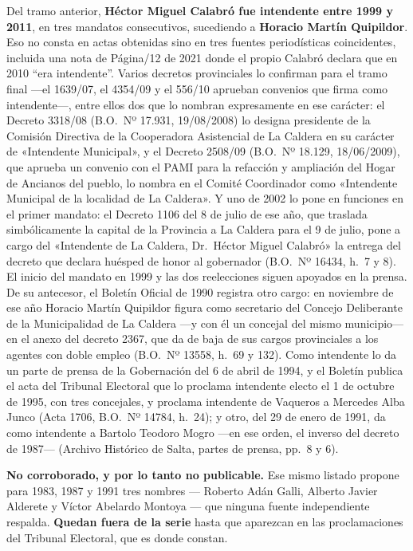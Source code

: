 \begin{cautela}
Del tramo anterior, \textbf{Héctor Miguel Calabró fue intendente entre 1999 y 2011}, en tres mandatos consecutivos, sucediendo a \textbf{Horacio Martín Quipildor}. Eso no consta en actas obtenidas sino en tres fuentes periodísticas coincidentes, incluida una nota de Página/12 de 2021 donde el propio Calabró declara que en 2010 ``era intendente''. Varios decretos provinciales lo confirman para el tramo final ---el 1639/07, el 4354/09 y el 556/10 aprueban convenios que firma como intendente---, entre ellos dos que lo nombran expresamente en ese carácter: el Decreto 3318/08 (B.O.\ Nº 17.931, 19/08/2008) lo designa presidente de la Comisión Directiva de la Cooperadora Asistencial de La Caldera en su carácter de «Intendente Municipal», y el Decreto 2508/09 (B.O.\ Nº 18.129, 18/06/2009), que aprueba un convenio con el PAMI para la refacción y ampliación del Hogar de Ancianos del pueblo, lo nombra en el Comité Coordinador como «Intendente Municipal de la localidad de La Caldera». Y uno de 2002 lo pone en funciones en el primer mandato: el Decreto 1106 del 8 de julio de ese año, que traslada simbólicamente la capital de la Provincia a La Caldera para el 9 de julio, pone a cargo del «Intendente de La Caldera, Dr.\ Héctor Miguel Calabró» la entrega del decreto que declara huésped de honor al gobernador (B.O.\ Nº 16434, h.\ 7 y 8). El inicio del mandato en 1999 y las dos reelecciones siguen apoyados en la prensa. De su antecesor, el Boletín Oficial de 1990 registra otro cargo: en noviembre de ese año Horacio Martín Quipildor figura como secretario del Concejo Deliberante de la Municipalidad de La Caldera ---y con él un concejal del mismo municipio--- en el anexo del decreto 2367, que da de baja de sus cargos provinciales a los agentes con doble empleo (B.O.\ Nº 13558, h.\ 69 y 132). Como intendente lo da un parte de prensa de la Gobernación del 6 de abril de 1994, y el Boletín publica el acta del Tribunal Electoral que lo proclama intendente electo el 1 de octubre de 1995, con tres concejales, y proclama intendente de Vaqueros a Mercedes Alba Junco (Acta 1706, B.O.\ Nº 14784, h.\ 24); y otro, del 29 de enero de 1991, da como intendente a Bartolo Teodoro Mogro ---en ese orden, el inverso del decreto de 1987--- (Archivo Histórico de Salta, partes de prensa, pp.~8 y 6).

\textbf{No corroborado, y por lo tanto no publicable.} Ese mismo listado propone para 1983, 1987 y 1991 tres nombres --- Roberto Adán Galli, Alberto Javier Alderete y Víctor Abelardo Montoya --- que ninguna fuente independiente respalda. \textbf{Quedan fuera de la serie} hasta que aparezcan en las proclamaciones del Tribunal Electoral, que es donde constan.
\end{cautela}

